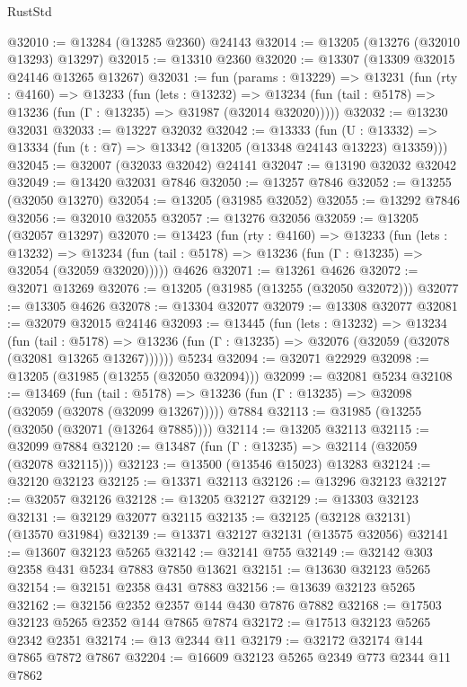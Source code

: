 \begin{lexlean}{RustStd}
\begin{coremodule}
@32010 := @13284 (@13285 @2360) @24143
@32014 := @13205 (@13276 (@32010 @13293) @13297)
@32015 := @13310 @2360
@32020 := @13307 (@13309 @32015 @24146 @13265 @13267)
@32031 := fun (params : @13229) =>
  @13231
    (fun (rty : @4160) =>
    @13233
      (fun (lets : @13232) =>
      @13234 (fun (tail : @5178) => @13236 (fun (Γ : @13235) => @31987 (@32014 @32020)))))
@32032 := @13230 @32031
@32033 := @13227 @32032
@32042 := @13333
    (fun (U : @13332) => @13334 (fun (t : @7) => @13342 (@13205 (@13348 @24143 @13223) @13359)))
@32045 := @32007 (@32033 @32042) @24141
@32047 := @13190 @32032 @32042
@32049 := @13420 @32031 @7846
@32050 := @13257 @7846
@32052 := @13255 (@32050 @13270)
@32054 := @13205 (@31985 @32052)
@32055 := @13292 @7846
@32056 := @32010 @32055
@32057 := @13276 @32056
@32059 := @13205 (@32057 @13297)
@32070 := @13423
    (fun (rty : @4160) =>
    @13233
      (fun (lets : @13232) =>
      @13234 (fun (tail : @5178) => @13236 (fun (Γ : @13235) => @32054 (@32059 @32020)))))
    @4626
@32071 := @13261 @4626
@32072 := @32071 @13269
@32076 := @13205 (@31985 (@13255 (@32050 @32072)))
@32077 := @13305 @4626
@32078 := @13304 @32077
@32079 := @13308 @32077
@32081 := @32079 @32015 @24146
@32093 := @13445
    (fun (lets : @13232) =>
    @13234
      (fun (tail : @5178) =>
      @13236 (fun (Γ : @13235) => @32076 (@32059 (@32078 (@32081 @13265 @13267))))))
    @5234
@32094 := @32071 @22929
@32098 := @13205 (@31985 (@13255 (@32050 @32094)))
@32099 := @32081 @5234
@32108 := @13469
    (fun (tail : @5178) => @13236 (fun (Γ : @13235) => @32098 (@32059 (@32078 (@32099 @13267)))))
    @7884
@32113 := @31985 (@13255 (@32050 (@32071 (@13264 @7885))))
@32114 := @13205 @32113
@32115 := @32099 @7884
@32120 := @13487 (fun (Γ : @13235) => @32114 (@32059 (@32078 @32115)))
@32123 := @13500 (@13546 @15023) @13283
@32124 := @32120 @32123
@32125 := @13371 @32113
@32126 := @13296 @32123
@32127 := @32057 @32126
@32128 := @13205 @32127
@32129 := @13303 @32123
@32131 := @32129 @32077 @32115
@32135 := @32125 (@32128 @32131) (@13570 @31984)
@32139 := @13371 @32127 @32131 (@13575 @32056)
@32141 := @13607 @32123 @5265
@32142 := @32141 @755
@32149 := @32142 @303 @2358 @431 @5234 @7883 @7850 @13621
@32151 := @13630 @32123 @5265
@32154 := @32151 @2358 @431 @7883
@32156 := @13639 @32123 @5265
@32162 := @32156 @2352 @2357 @144 @430 @7876 @7882
@32168 := @17503 @32123 @5265 @2352 @144 @7865 @7874
@32172 := @17513 @32123 @5265 @2342 @2351
@32174 := @13 @2344 @11
@32179 := @32172 @32174 @144 @7865 @7872 @7867
@32204 := @16609
    @32123
    @5265
    @2349
    @773
    @2344
    @11
    @7862

\end{coremodule}
\end{lexlean}
